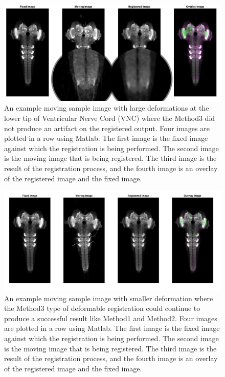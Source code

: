 \documentclass{report}
\begin{document}
	\begin{figure}[h]
		\centering
		\includegraphics[width=0.8\columnwidth]{resources/chapter4/method3/compare/np_52B07_52H01_MB262B_021713B_scaled.png}
		\caption{An example moving sample image with large deformations at the lower tip of Ventricular Nerve Cord (VNC) where the Method3 did not produce an artifact on the registered output. Four images are plotted in a row using Matlab. The first image is the fixed image against which the registration is being performed. The second image is the moving image that is being registered. The third image is the result of the registration process, and the fourth image is an overlay of the registered image and the fixed image.}
		\label{fig:method3_artifact}
	\end{figure}
	
	\begin{figure}[h]
		\centering
		\includegraphics[width=0.8\columnwidth]{resources/chapter4/method3/compare/np_brain7_scaled.tif.png}
		\caption{An example moving sample image with smaller deformation where the Method3 type of deformable registration could continue to produce a successful result like Method1 and Method2. Four images are plotted in a row using Matlab. The first image is the fixed image against which the registration is being performed. The second image is the moving image that is being registered. The third image is the result of the registration process, and the fourth image is an overlay of the registered image and the fixed image.}
		\label{fig:method3_pas}
	\end{figure}
	
\end{document}
